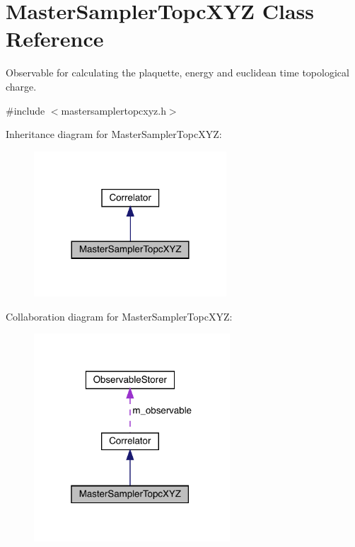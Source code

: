 \hypertarget{class_master_sampler_topc_x_y_z}{}\section{Master\+Sampler\+Topc\+X\+YZ Class Reference}
\label{class_master_sampler_topc_x_y_z}


Observable for calculating the plaquette, energy and euclidean time topological charge.  




{\ttfamily \#include $<$mastersamplertopcxyz.\+h$>$}



Inheritance diagram for Master\+Sampler\+Topc\+X\+YZ\+:
\nopagebreak
\begin{figure}[H]
\begin{center}
\leavevmode
\includegraphics[width=204pt]{class_master_sampler_topc_x_y_z__inherit__graph}
\end{center}
\end{figure}


Collaboration diagram for Master\+Sampler\+Topc\+X\+YZ\+:
\nopagebreak
\begin{figure}[H]
\begin{center}
\leavevmode
\includegraphics[width=208pt]{class_master_sampler_topc_x_y_z__coll__graph}
\end{center}
\end{figure}
